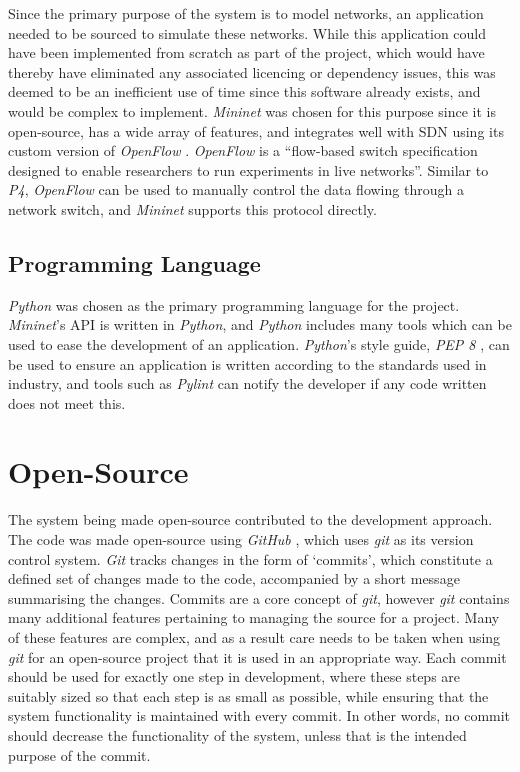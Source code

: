 Since the primary purpose of the system is to model networks, an application needed to be sourced to simulate these networks.
While this application could have been implemented from scratch as part of the project, which would have thereby have eliminated any associated licencing or dependency issues, this was deemed to be an inefficient use of time since this software already exists, and would be complex to implement.
\textit{Mininet} was chosen for this purpose since it is open-source, has a wide array of features, and integrates well with SDN using its custom version of \textit{OpenFlow} \cite{mininet_openflow}.
\textit{OpenFlow} is a ``flow-based switch specification designed to enable researchers to run experiments in live networks''.
Similar to \textit{P4}, \textit{OpenFlow} can be used to manually control the data flowing through a network switch, and \textit{Mininet} supports this protocol directly.

\subsection{Programming Language}

\textit{Python} \cite{python} was chosen as the primary programming language for the project.
\textit{Mininet}'s API is written in \textit{Python}, and \textit{Python} includes many tools which can be used to ease the development of an application.
\textit{Python}'s style guide, \textit{PEP 8} \cite{python_pep8}, can be used to ensure an application is written according to the standards used in industry, and tools such as \textit{Pylint} can notify the developer if any code written does not meet this.

\section{Open-Source}
\label{open_source}

The system being made open-source contributed to the development approach.
The code was made open-source using \textit{GitHub} \cite{github}, which uses \textit{git} \cite{git} as its version control system.
\textit{Git} tracks changes in the form of `commits', which constitute a defined set of changes made to the code, accompanied by a short message summarising the changes.
Commits are a core concept of \textit{git}, however \textit{git} contains many additional features pertaining to managing the source for a project.
Many of these features are complex, and as a result care needs to be taken when using \textit{git} for an open-source project that it is used in an appropriate way.
Each commit should be used for exactly one step in development, where these steps are suitably sized so that each step is as small as possible, while ensuring that the system functionality is maintained with every commit.
In other words, no commit should decrease the functionality of the system, unless that is the intended purpose of the commit.

